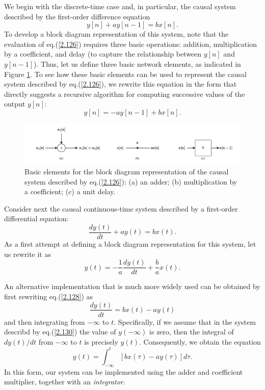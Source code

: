 \documentclass[a4paper,10pt,twoside]{book}
\begin{document}
We begin with the discrete-time case and, in particular, the causal system described by the first-order difference equation
\begin{equation}
    y[n]+ay[n-1]=bx[n].
    \label{2.126}
\end{equation}
To develop a block diagram representation of this system, note that the evaluation of eq.\;(\ref{2.126}) requires three basic operations: addition, multiplication by a coefficient, and delay (to capture the relationship between $y[n]$ and $y[n-1]$). Thus, let us define three basic network elements, as indicated in Figure \ref{Fig7}. To see how these basic elements can be used to represent the causal system described by eq.\;(\ref{2.126}), we rewrite this equation in the form that directly suggests a recursive algorithm for computing successive values of the output $y[n]$:
\begin{equation}
    y[n]=-ay[n-1]+bx[n].
    \label{2.127}
\end{equation}

\begin{figure}[htbp]
    \centering
    \includegraphics[width=\linewidth]{Fig7.pdf}
    \caption{Basic elements for the block diagram representation of the causal system described by eq.\;(\ref{2.126}): (a) an adder; (b) multiplication by a coefficient; (c) a unit delay.}
    \label{Fig7}
\end{figure}

Consider next the causal continuous-time system described by a first-order differential equation:
\begin{equation}
    \dfrac{dy(t)}{dt}+ay(t)=bx(t).
    \label{2.128}
\end{equation}
As a first attempt at defining a block diagram representation for this system, let us rewrite it as
\begin{equation}
    y(t)=-\dfrac{1}{a}\dfrac{dy(t)}{dt}+\dfrac{b}{a}x(t).
    \label{2.129}
\end{equation}

An alternative implementation that is much more widely used can be obtained by first rewriting eq.\;(\ref{2.128}) as
\begin{equation}
    \dfrac{dy(t)}{dt}=bx(t)-ay(t)
    \label{2.130}
\end{equation}
and then integrating from $-\infty$ to $t$. Specifically, if we assume that in the system describd by eq.\;(\ref{2.130}) the value of $y(-\infty)$ is zero, then the integral of $dy(t)/dt$ from $-\infty$ to $t$ is precisely $y(t)$. Consequently, we obtain the equation
\begin{equation}
    y(t) = \int_{-\infty}^t\left[bx(\tau)-ay(\tau)\right] d\tau.
    \label{2.131}
\end{equation}
In this form, our system can be implemented using the adder and coefficient multiplier, together with an \textit{integrator}.
\end{document}
